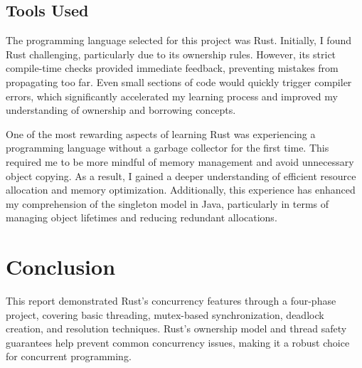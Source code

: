 \documentclass{report}
\begin{document}
\section{Tools Used}
The programming language selected for this project was Rust. Initially, I found Rust challenging, particularly due to its ownership rules. However, its strict compile-time checks provided immediate feedback, preventing mistakes from propagating too far. Even small sections of code would quickly trigger compiler errors, which significantly accelerated my learning process and improved my understanding of ownership and borrowing concepts.  

One of the most rewarding aspects of learning Rust was experiencing a programming language without a garbage collector for the first time. This required me to be more mindful of memory management and avoid unnecessary object copying. As a result, I gained a deeper understanding of efficient resource allocation and memory optimization. Additionally, this experience has enhanced my comprehension of the singleton model in Java, particularly in terms of managing object lifetimes and reducing redundant allocations.


\chapter{Conclusion}
This report demonstrated Rust's concurrency features through a four-phase project, covering basic threading, mutex-based synchronization, deadlock creation, and resolution techniques. Rust's ownership model and thread safety guarantees help prevent common concurrency issues, making it a robust choice for concurrent programming.
\end{document}
